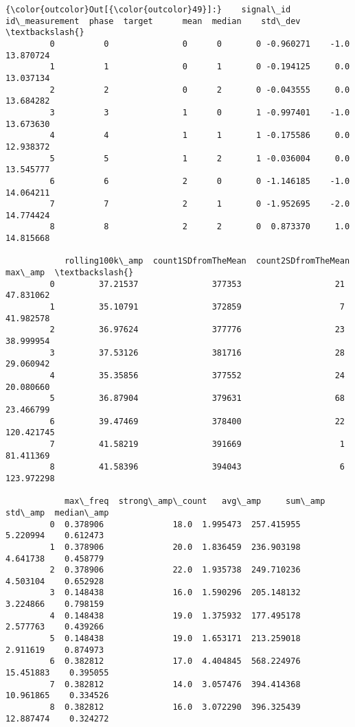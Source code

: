 \documentclass[11pt]{article}
\begin{document}
\begin{Verbatim}[commandchars=\\\{\}]
{\color{outcolor}Out[{\color{outcolor}49}]:}    signal\_id  id\_measurement  phase  target      mean  median    std\_dev  \textbackslash{}
         0          0               0      0       0 -0.960271    -1.0  13.870724   
         1          1               0      1       0 -0.194125     0.0  13.037134   
         2          2               0      2       0 -0.043555     0.0  13.684282   
         3          3               1      0       1 -0.997401    -1.0  13.673630   
         4          4               1      1       1 -0.175586     0.0  12.938372   
         5          5               1      2       1 -0.036004     0.0  13.545777   
         6          6               2      0       0 -1.146185    -1.0  14.064211   
         7          7               2      1       0 -1.952695    -2.0  14.774424   
         8          8               2      2       0  0.873370     1.0  14.815668   
         
            rolling100k\_amp  count1SDfromTheMean  count2SDfromTheMean     max\_amp  \textbackslash{}
         0         37.21537               377353                   21   47.831062   
         1         35.10791               372859                    7   41.982578   
         2         36.97624               377776                   23   38.999954   
         3         37.53126               381716                   28   29.060942   
         4         35.35856               377552                   24   20.080660   
         5         36.87904               379631                   68   23.466799   
         6         39.47469               378400                   22  120.421745   
         7         41.58219               391669                    1   81.411369   
         8         41.58396               394043                    6  123.972298   
         
            max\_freq  strong\_amp\_count   avg\_amp     sum\_amp    std\_amp  median\_amp  
         0  0.378906              18.0  1.995473  257.415955   5.220994    0.612473  
         1  0.378906              20.0  1.836459  236.903198   4.641738    0.458779  
         2  0.378906              22.0  1.935738  249.710236   4.503104    0.652928  
         3  0.148438              16.0  1.590296  205.148132   3.224866    0.798159  
         4  0.148438              19.0  1.375932  177.495178   2.577763    0.439266  
         5  0.148438              19.0  1.653171  213.259018   2.911619    0.874973  
         6  0.382812              17.0  4.404845  568.224976  15.451883    0.395055  
         7  0.382812              14.0  3.057476  394.414368  10.961865    0.334526  
         8  0.382812              16.0  3.072290  396.325439  12.887474    0.324272  
\end{Verbatim}
            
\end{document}
